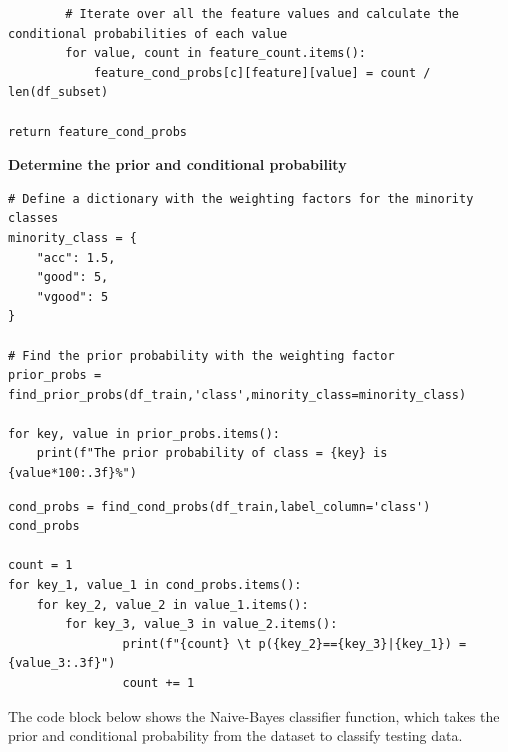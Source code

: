 \documentclass[a4paper]{article}
\begin{document}
\begin{lstlisting}
        # Iterate over all the feature values and calculate the conditional probabilities of each value 
        for value, count in feature_count.items():                  
            feature_cond_probs[c][feature][value] = count / len(df_subset)

return feature_cond_probs
\end{lstlisting}

\textbf{Determine the prior and conditional probability}
\begin{lstlisting}
# Define a dictionary with the weighting factors for the minority classes
minority_class = {
    "acc": 1.5,
    "good": 5,
    "vgood": 5
}

# Find the prior probability with the weighting factor
prior_probs = find_prior_probs(df_train,'class',minority_class=minority_class)

for key, value in prior_probs.items():
    print(f"The prior probability of class = {key} is {value*100:.3f}%")
\end{lstlisting}

\begin{lstlisting}
cond_probs = find_cond_probs(df_train,label_column='class')
cond_probs

count = 1
for key_1, value_1 in cond_probs.items():
    for key_2, value_2 in value_1.items():
        for key_3, value_3 in value_2.items():
                print(f"{count} \t p({key_2}=={key_3}|{key_1}) = {value_3:.3f}")
                count += 1
\end{lstlisting}

The code block below shows the Naive-Bayes classifier function, which takes the prior and conditional probability from the dataset to classify testing data.
\end{document}
